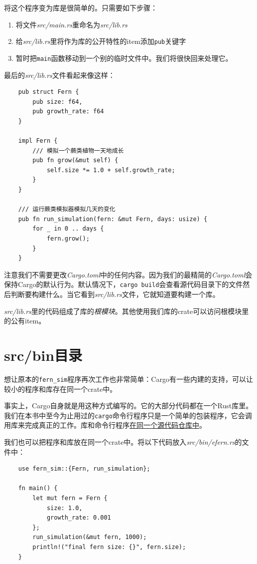将这个程序变为库是很简单的。只需要如下步骤：
\begin{enumerate}
    \item 将文件\emph{src/main.rs}重命名为\emph{src/lib.rs}
    \item 给\emph{src/lib.rs}里将作为库的公开特性的item添加\texttt{pub}关键字
    \item 暂时把\texttt{main}函数移动到一个别的临时文件中。我们将很快回来处理它。
\end{enumerate}

最后的\emph{src/lib.rs}文件看起来像这样：
\begin{verbatim}
    pub struct Fern {
        pub size: f64,
        pub growth_rate: f64
    }

    impl Fern {
        /// 模拟一个蕨类植物一天地成长
        pub fn grow(&mut self) {
            self.size *= 1.0 + self.growth_rate;
        }
    }

    /// 运行蕨类模拟器模拟几天的变化
    pub fn run_simulation(fern: &mut Fern, days: usize) {
        for _ in 0 .. days {
            fern.grow();
        }
    }
\end{verbatim}

注意我们不需要更改\emph{Cargo.toml}中的任何内容。因为我们的最精简的\emph{Cargo.toml}会保持Cargo的默认行为。默认情况下，\texttt{cargo build}会查看源代码目录下的文件然后判断要构建什么。当它看到\emph{src/lib.rs}文件，它就知道要构建一个库。

\emph{src/lib.rs}里的代码组成了库的\emph{根模块}。其他使用我们库的crate可以访问根模块里的公有item。

\section{src/bin目录}\label{src/bin}

想让原本的\texttt{fern\_sim}程序再次工作也非常简单：Cargo有一些内建的支持，可以让较小的程序和库存在同一个crate中。

事实上，Cargo自身就是用这种方式编写的。它的大部分代码都在一个Rust库里。我们在本书中至今为止用过的\texttt{cargo}命令行程序只是一个简单的包装程序，它会调用库来完成真正的工作。库和命令行程序\href{https://github.com/rust-lang/cargo}{在同一个源代码仓库中}。

我们也可以把程序和库放在同一个crate中。将以下代码放入\emph{src/bin/efern.rs}的文件中：
\begin{verbatim}
    use fern_sim::{Fern, run_simulation};

    fn main() {
        let mut fern = Fern {
            size: 1.0,
            growth_rate: 0.001
        };
        run_simulation(&mut fern, 1000);
        println!("final fern size: {}", fern.size);
    }
\end{verbatim}

